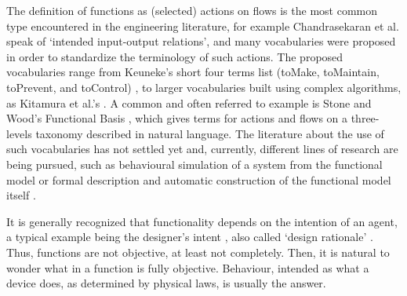 \documentclass[sw]{iosart2x}
\newcommand{\quotes}[1]{`#1'}
\begin{document}
The definition of functions as (selected) actions on flows is the most common type encountered in the engineering literature, for example Chandrasekaran et al. \cite{chandrasekaranFunctionalRepresentationDesign1993} speak of \quotes{intended input-output relations}, and many vocabularies were proposed in order to standardize the terminology of such actions. 
The proposed vocabularies range from Keuneke's short four terms list (toMake, toMaintain, toPrevent, and toControl) \cite{keuneke_device_1991}, to larger vocabularies built using complex algorithms, as Kitamura et al.'s \cite{kitamuraFunctionalConceptOntology2002a}. 
A common and often referred to example is Stone and Wood's Functional Basis \cite{hirtz_functional_2002, stone_development_2000}, which gives terms for actions and flows on a three-levels taxonomy described in natural language.
The literature about the use of such vocabularies has not settled yet and, currently, different lines of research are being pursued, such as behavioural simulation of a system from the functional model \cite{kurtogluGraphBasedFaultIdentification2008} or formal description and automatic construction of the functional model itself \cite{gill_logic_2021,kurtoglu_automating_2010}.

It is generally recognized that functionality depends on the intention of an agent, a typical example being the designer's intent  \cite{kitamuraOntologyBasedFunctionalKnowledgeModeling2004}, also called \quotes{design rationale} \cite{chandrasekaranFunctionalRepresentationDesign1993}. 
Thus, functions are not objective, at least not completely. 
Then, it is natural to wonder what in a function is fully objective. Behaviour, intended as what a device does, as determined by physical laws, is usually the answer.    

\end{document}
